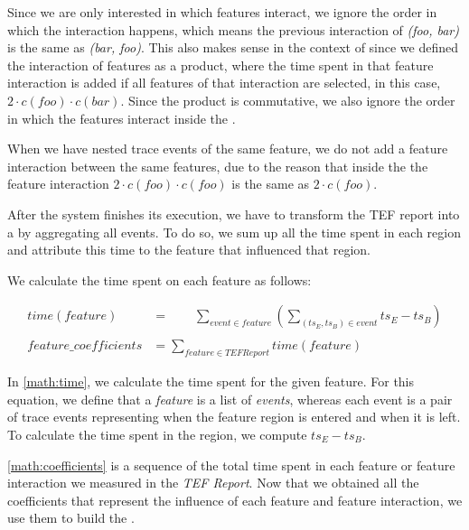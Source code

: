 Since we are only interested in which features interact, we ignore the order in which the interaction happens, which means the previous
interaction of \emph{(foo, bar)} is the same as \emph{(bar, foo)}. This also makes sense in the context of {\perfInfluenceModel} since we defined
the interaction of features as a product, where the time spent in that feature interaction is added if all features of that interaction are selected,
in this case, $2 \cdot c(foo) \cdot c(bar)$. Since the product is commutative, we also ignore the order in which the features interact inside the \perfInfluenceModel.

When we have nested trace events of the same feature, we do not add a feature interaction between the same features, 
due to the reason that inside the {\perfInfluenceModel} the feature interaction $2 \cdot c(foo) \cdot c(foo)$ is the same as $2 \cdot c(foo)$.

After the system finishes its execution, we have to transform the TEF report into a {\perfInfluenceModel} by aggregating all events. 
To do so, we sum up all the time spent in each region and attribute this time to the feature that influenced that region. 

We calculate the time spent on each feature as follows:


\begin{align}
    time(feature) &= \textit{ }\textit{ }\textit{ } \sum_{event \in feature} \left( \sum_{(ts_E, ts_B) \in event} ts_E - ts_B \right) \label{math:time}\\ \nonumber \\
    feature\_coefficients &= \sum_{feature \in TEFReport}time(feature) \label{math:coefficients}
\end{align}

In \autoref{math:time}, we calculate the time spent for the given feature. 
For this equation, we define that a \textit{feature} is a list of \textit{events}, 
whereas each event is a pair of trace events representing when the feature region is entered and when it is left. 
To calculate the time spent in the region, we compute $ts_E - ts_B$.

\autoref{math:coefficients} is a sequence of the total time spent in each feature or feature interaction we measured in the \textit{TEF Report}. 
Now that we obtained all the coefficients that represent the influence of each feature and feature interaction, we use them to build the \perfInfluenceModel.
